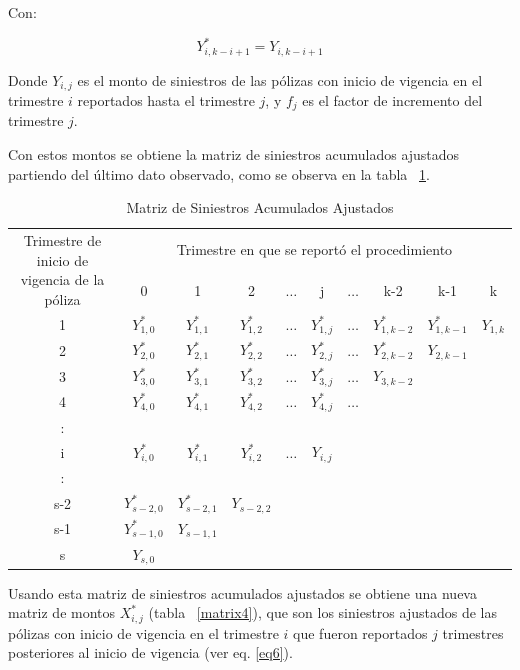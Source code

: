 \documentclass[11pt,twoside,openright,spanish]{report}
\numberwithin{equation}{chapter}
\numberwithin{figure}{chapter}
\numberwithin{table}{chapter}
\begin{document}
	Con:

	$${Y}_{i,k-i+1}^{*}={Y}_{i,k-i+1}$$	

	Donde ${Y}_{i,j}$ es el monto de siniestros de las pólizas con inicio de vigencia en el trimestre $i$ reportados hasta el trimestre $j$, y ${f}_{j}$ es el factor de incremento del trimestre $j$.

	Con estos montos se obtiene la matriz de siniestros acumulados ajustados partiendo del último dato observado, como se observa en la tabla ~\ref{matrix3}.
		
	\begin{table}[ht]
		\centering

		\begin{tabularx}{\linewidth}{ c |ccccccccc}
			\multirow{2}{4cm}{Trimestre de inicio de vigencia de la póliza}
			& \multicolumn{9}{c}{Trimestre en que se reportó el procedimiento} \\ 
			& 0  & 1 & 2 & $ \dots $ & j & $\dots $ & k-2 & k-1 &  k \\
			\midrule
			1      &  $Y_{1,0}^{*}$ & $Y_{1,1}^{*}$ & $Y_{1,2}^{*}$ & $ \dots $ & $Y_{1,j}^{*}$ & $ \dots $ & $Y_{1,k-2}^{*}$ & $Y_{1,k-1}^{*}$ & $Y_{1,k}^{}$ \\
			2      &  $Y_{2,0}^{*}$ & $Y_{2,1}^{*}$ & $Y_{2,2}^{*}$ & $ \dots $ & $Y_{2,j}^{*}$ & $ \dots $ & $Y_{2,k-2}^{*}$ & $Y_{2,k-1}^{}$ & \\
			3      &  $Y_{3,0}^{*}$ & $Y_{3,1}^{*}$ & $Y_{3,2}^{*}$ & $ \dots $ & $Y_{3,j}^{*}$ & $ \dots $ & $Y_{3,k-2}^{}$ & & \\
			4      &  $Y_{4,0}^{*}$ & $Y_{4,1}^{*}$ & $Y_{4,2}^{*}$ & $ \dots $ & $Y_{4,j}^{*}$ & $ \dots $ & & & \\
			:      & & & & & & & & & \\
			i      &  $Y_{i,0}^{*}$ & $Y_{i,1}^{*}$ & $Y_{i,2}^{*}$ & $ \dots $ & $Y_{i,j}^{}$ & & & & \\
			:      & & & & & & & & & \\
			s-2      &  $Y_{s-2,0}^{*}$ & $Y_{s-2,1}^{*}$ & $Y_{s-2,2}^{}$ & & & & & & \\
			s-1      &  $Y_{s-1,0}^{*}$ & $Y_{s-1,1}^{}$ & & & & & & & \\
			s      &  $Y_{s,0}^{}$ & & & & & & & & \\
		\end{tabularx}
			\caption{Matriz de Siniestros Acumulados Ajustados}
	\label{matrix3}
	\end{table}
	
	Usando esta matriz de siniestros acumulados ajustados se obtiene una nueva matriz de montos $X_{i,j}^{*}$ (tabla ~\ref{matrix4}), que son los siniestros ajustados de las pólizas con inicio de vigencia en el trimestre $i$ que fueron reportados $j$ trimestres posteriores al inicio de vigencia (ver eq. \ref{eq6}).
	
\end{document}
